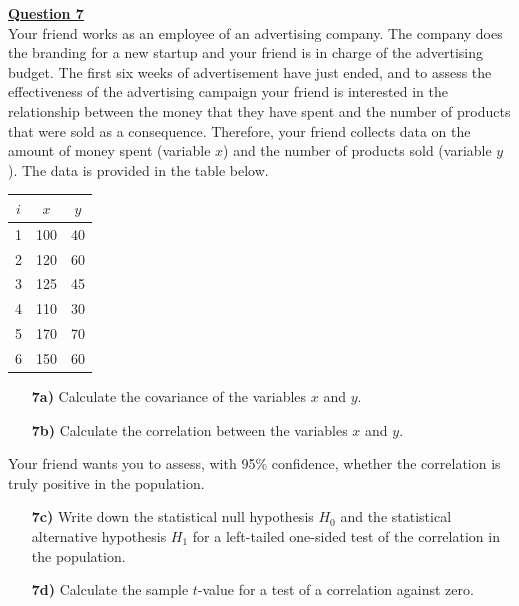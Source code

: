 \underline{\textbf{Question 7}} \\

Your friend works as an employee of an advertising company. The company does the branding for a new startup and your friend is in charge of the advertising budget. The first six weeks of advertisement have just ended, and to assess the effectiveness of the advertising campaign your friend is interested in the relationship between the money that they have spent and the number of products that were sold as a consequence. Therefore, your friend collects data on the amount of money spent (variable $x$) and the number of products sold (variable $y$). The data is provided in the table below. \\

\begin{center}
\begin{tabular}{c|c|c}
     $i$ & $x$ & $y$ \\
     \hline
     1 & 100 & 40 \\
     2 & 120 & 60 \\
     3 & 125 & 45 \\
     4 & 110 & 30 \\ 
     5 & 170 & 70 \\
     6 & 150 & 60
\end{tabular}
\end{center} 

\clearpage %

\begin{itemize}

    \item[\textbf{7a)}] Calculate the covariance of the variables $x$ and $y$.
    
    \item[\textbf{7b)}] Calculate the correlation between the variables $x$ and $y$.
    
\end{itemize}

Your friend wants you to assess, with 95\% confidence, whether the correlation is truly positive in the population.

\begin{itemize}
    
    \item[\textbf{7c)}] Write down the statistical null hypothesis $H_0$ and the statistical alternative hypothesis $H_1$ for a left-tailed one-sided test of the correlation in the population.
    
    \item[\textbf{7d)}] Calculate the sample $t$-value for a test of a correlation against zero.
    
\end{itemize}

